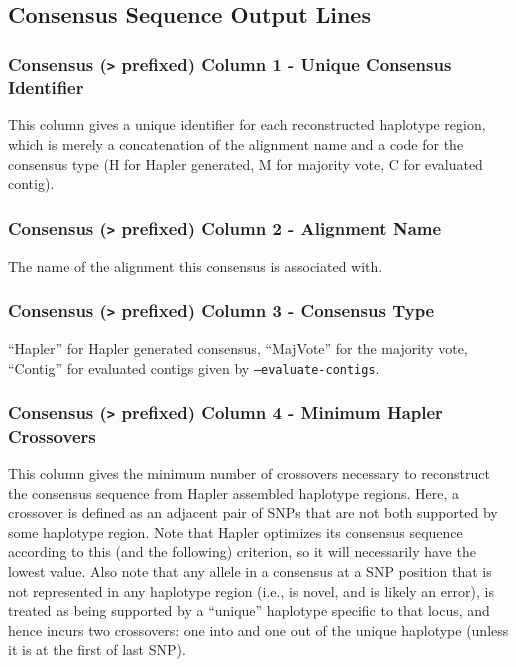 \documentclass[11pt]{llncs}
\begin{document}
\newpage
\subsection{Consensus Sequence Output Lines}

\subsubsection{Consensus (\texttt{>} prefixed) Column 1 - Unique Consensus Identifier}

This column gives a unique identifier for each reconstructed haplotype region, which is merely a concatenation of the alignment name and
a code for the consensus type (H for Hapler generated, M for majority vote, C for evaluated contig).


\subsubsection{Consensus (\texttt{>} prefixed) Column 2 - Alignment Name}

The name of the alignment this consensus is associated with.

\subsubsection{Consensus (\texttt{>} prefixed) Column 3 - Consensus Type}

``Hapler'' for Hapler generated consensus, ``MajVote'' for the majority vote, ``Contig'' for evaluated contigs given by \texttt{--evaluate-contigs}.

\subsubsection{Consensus (\texttt{>} prefixed) Column 4 - Minimum Hapler Crossovers}

This column gives the minimum number of crossovers necessary to reconstruct the consensus sequence from Hapler assembled haplotype regions. Here, a 
crossover is defined as an adjacent pair of SNPs that are not both supported by some haplotype region. Note that Hapler optimizes its consensus 
sequence according to this (and the following) criterion, so it will necessarily have the lowest value. Also note that any allele in a consensus at a 
SNP position that is not represented in any haplotype region (i.e., is novel, and is likely an error), is treated as being supported by a ``unique'' 
haplotype specific to that locus, and hence incurs two crossovers: one into and one out of the unique haplotype (unless it is at the first of last 
SNP).
\end{document}
